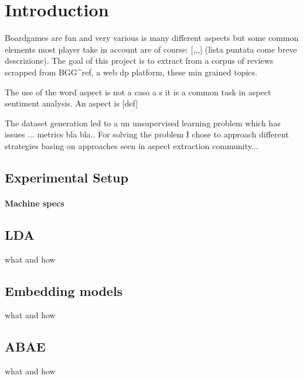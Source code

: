 \section{Introduction}

Boardgames are fun and very various is many different aspects but some common elements most player take in account
are of course: [,,,] (lista puntata come breve descrizione).
The goal of this project is to extract from a corpus of reviews scrapped from BGG^ref, a web dp platform, these min grained topics.

The use of the word aspect is not a caso a s it is a common task in aspect sentiment analysis.
An aspect is [def]

The dataset generation led to a un unsupervised learning problem which has issues ... metrics bla bla..
For solving the problem I chose to approach different strategies basing on approaches seen in aspect extraction community...

\subsection{Experimental Setup}

\paragraph{Machine specs}

\subsection{LDA}
what and how

\subsection{Embedding models}
what and how

\subsection{ABAE}
what and how

